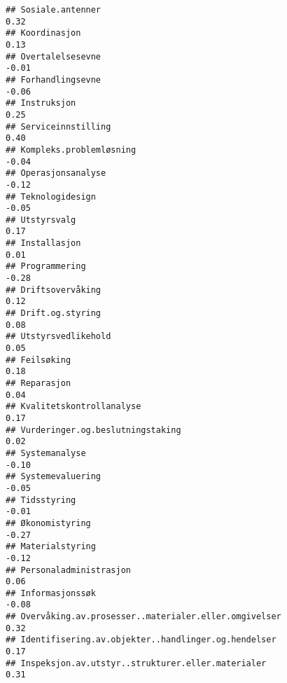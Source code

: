 \documentclass[
]{article}
\begin{document}
\begin{verbatim}
## Sosiale.antenner                                                                  0.32
## Koordinasjon                                                                      0.13
## Overtalelsesevne                                                                 -0.01
## Forhandlingsevne                                                                 -0.06
## Instruksjon                                                                       0.25
## Serviceinnstilling                                                                0.40
## Kompleks.problemløsning                                                          -0.04
## Operasjonsanalyse                                                                -0.12
## Teknologidesign                                                                  -0.05
## Utstyrsvalg                                                                       0.17
## Installasjon                                                                      0.01
## Programmering                                                                    -0.28
## Driftsovervåking                                                                  0.12
## Drift.og.styring                                                                  0.08
## Utstyrsvedlikehold                                                                0.05
## Feilsøking                                                                        0.18
## Reparasjon                                                                        0.04
## Kvalitetskontrollanalyse                                                          0.17
## Vurderinger.og.beslutningstaking                                                  0.02
## Systemanalyse                                                                    -0.10
## Systemevaluering                                                                 -0.05
## Tidsstyring                                                                      -0.01
## Økonomistyring                                                                   -0.27
## Materialstyring                                                                  -0.12
## Personaladministrasjon                                                            0.06
## Informasjonssøk                                                                  -0.08
## Overvåking.av.prosesser..materialer.eller.omgivelser                              0.32
## Identifisering.av.objekter..handlinger.og.hendelser                               0.17
## Inspeksjon.av.utstyr..strukturer.eller.materialer                                 0.31

\end{verbatim}
\end{document}
